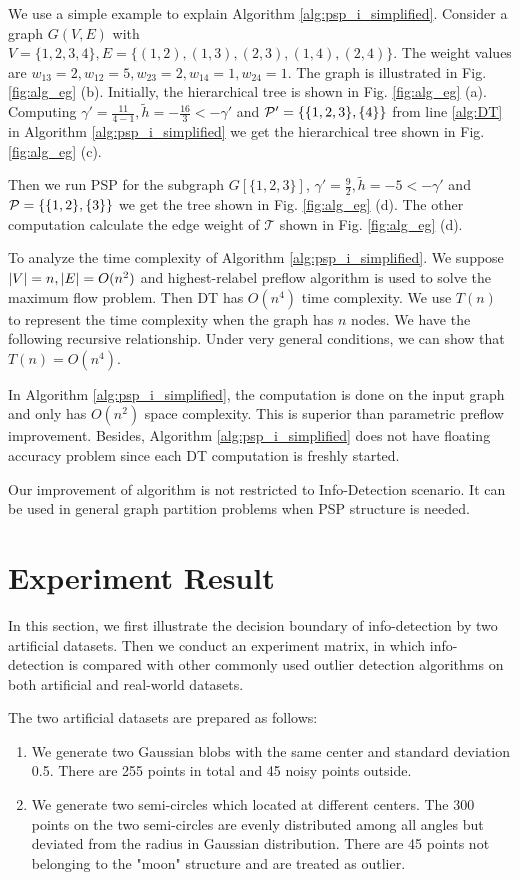 \documentclass[runningheads]{llncs}
\begin{document}
\begin{example}
	We use a simple example to explain Algorithm \ref{alg:psp_i_simplified}. Consider a graph $G(V, E)$ with $V=\{1,2,3,4\}, E=\{(1,2),(1,3),(2,3),(1,4),(2,4)\}$. The weight values are $w_{13}=2, w_{12}=5, w_{23}=2, w_{14}=1, w_{24}=1$. The graph is illustrated
	in Fig. \ref{fig:alg_eg} (b). Initially, the hierarchical tree is shown in Fig. \ref{fig:alg_eg} (a). Computing $\gamma' = \frac{11}{4-1}, \tilde{h} = -\frac{16}{3} < -\gamma' $ and $\P' = \{\{1,2,3\},\{4\}\}$ from line \ref {alg:DT} in Algorithm \ref{alg:psp_i_simplified} we get the hierarchical tree shown in Fig. \ref{fig:alg_eg} (c).
	
	Then we run PSP for the subgraph $G[\{1,2,3\}]$, $\gamma' = \frac{9}{2}, \tilde{h} = -5 < -\gamma'$ and $\P= \{\{1,2\},\{3\}\}$ we get the tree shown in Fig. \ref{fig:alg_eg} (d). The other computation calculate the edge weight of $\mathcal{T}$ shown in Fig. \ref{fig:alg_eg} (d).
\end{example}		

To analyze the time complexity of Algorithm \ref{alg:psp_i_simplified}. We suppose $\abs{V} = n, \abs{E} = O(n^2)$ and highest-relabel preflow algorithm is used to solve the maximum flow problem. Then DT has $O(n^4)$ time complexity. 
We use $T(n)$ to represent the time complexity when the graph has $n$ nodes. We have the following recursive relationship. Under very general conditions, we can show that $T(n) = O(n^4)$. 

In Algorithm \ref{alg:psp_i_simplified}, the computation is done on the input graph and only has $O(n^2)$ space complexity. This is superior than parametric preflow improvement. Besides, Algorithm \ref{alg:psp_i_simplified} does not have floating accuracy problem since each DT computation is freshly started. 

Our improvement of algorithm is not restricted to Info-Detection scenario. It can be used in general graph partition problems when PSP structure is needed.

\section{Experiment Result}
In this section, we first illustrate the decision boundary of info-detection by two artificial datasets. Then we conduct an experiment matrix, in which info-detection is compared with other commonly used outlier detection algorithms on both artificial and real-world datasets.

The two artificial datasets are prepared as follows:
\begin{enumerate}
\item We generate two Gaussian blobs with the same center and standard deviation 0.5. There are 255 points in total and 45 noisy points outside.
\item We generate two semi-circles which located at different centers. The 300 points on the two semi-circles are evenly distributed among all angles but deviated from the radius in Gaussian distribution. There are 45 points not belonging to the "moon" structure and are treated as outlier.
\end{enumerate}
\end{document}
